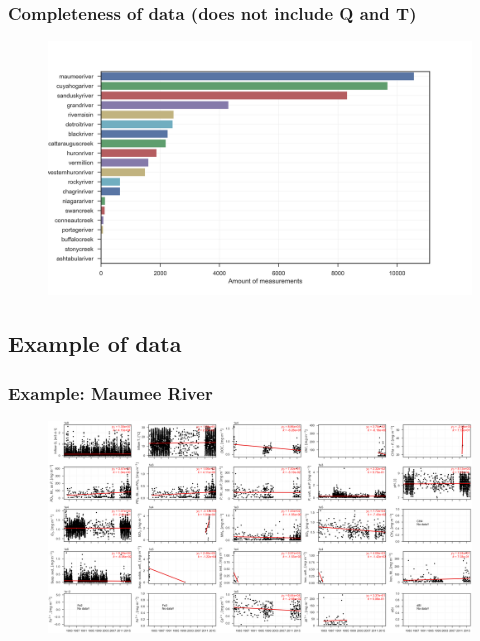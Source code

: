 \documentclass{beamer}
\begin{document}
\begin{frame}
\frametitle{Completeness of data (does not include Q and T)}
\begin{figure}
\includegraphics[width=\textwidth]{rivers/completeness_of_measurements.png}
\end{figure}
\end{frame}

\subsection{Example of data}

\begin{frame}
\frametitle{Example: Maumee River}
\begin{figure}
\includegraphics[width=\textwidth]{rivers/Western basin/plot_all maumeeriver.png}
\end{figure}
\end{frame}
\end{document}
